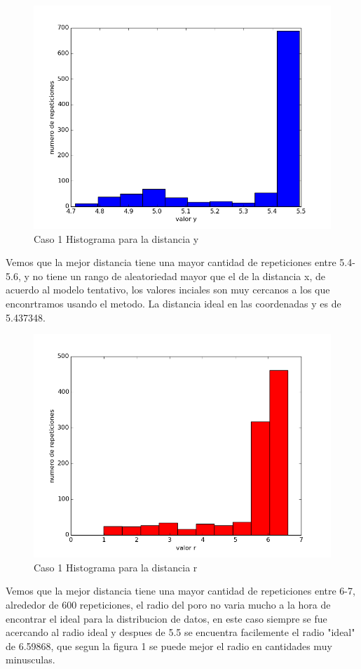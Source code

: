 \documentclass{article}
\begin{document}
\newpage
\begin{figure}[h!]
  \includegraphics[scale=0.5]{histrogramay.png}
  \caption{Caso 1 Histograma para la distancia y  }
\end{figure}
Vemos que la mejor distancia tiene una mayor cantidad de repeticiones entre 5.4-5.6, y no tiene un rango de aleatoriedad mayor que el de la distancia x, de acuerdo al modelo tentativo, los valores inciales son muy cercanos a los que enconrtramos usando el metodo. La distancia ideal en las coordenadas y es de 5.437348.  \\

\newpage
\begin{figure}[h!]
  \includegraphics[scale=0.5]{histrogramar.png}
  \caption{Caso 1 Histograma para la distancia r  }
\end{figure}
Vemos que la mejor distancia tiene una mayor cantidad de repeticiones entre 6-7, alrededor de 600 repeticiones, el radio del poro no varia mucho a la hora de encontrar el ideal para la distribucion de datos, en este caso siempre se fue acercando al radio ideal y despues de 5.5 se encuentra facilemente el radio "ideal" de 6.59868, que segun la figura 1 se puede mejor el radio en cantidades muy minusculas.   \\
\end{document}
